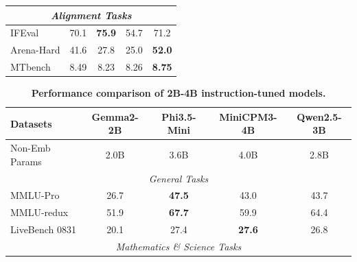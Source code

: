 \documentclass{article}
\begin{document}
\begin{table}[t]
\begin{tabular}{@{}lcccc@{}}
\midrule

\multicolumn{5}{c}{\textit{Alignment Tasks}} \\

\midrule

IFEval & 70.1 & \textbf{75.9} & 54.7 & 71.2 \\

Arena-Hard & 41.6 & 27.8 & 25.0 & \textbf{52.0} \\

MTbench & 8.49 & 8.23 & 8.26 & \textbf{8.75} \\

\bottomrule

\end{tabular}

\end{table}

\begin{table}[t]

\centering

\caption{\textbf{Performance comparison of 2B-4B instruction-tuned models.}}

\label{tab:4b-instruct}
\small
\setlength{\tabcolsep}{2.6pt}

\begin{tabular}{@{}lcccc@{}}

\toprule

\textbf{Datasets} & \textbf{Gemma2-2B} & \textbf{Phi3.5-Mini} & \textbf{MiniCPM3-4B} & \textbf{Qwen2.5-3B} \\

\midrule

Non-Emb Params & 2.0B & 3.6B & 4.0B & 2.8B \\

\midrule

\multicolumn{5}{c}{\textit{General Tasks}} \\

\midrule

MMLU-Pro & 26.7 & \textbf{47.5} & 43.0 & 43.7 \\

MMLU-redux & 51.9 & \textbf{67.7} & 59.9 & 64.4 \\

LiveBench 0831 & 20.1 & 27.4 & \textbf{27.6} & 26.8 \\

\midrule

\multicolumn{5}{c}{\textit{Mathematics \& Science Tasks}} \\

\midrule


\end{tabular}
\end{table}
\end{document}
